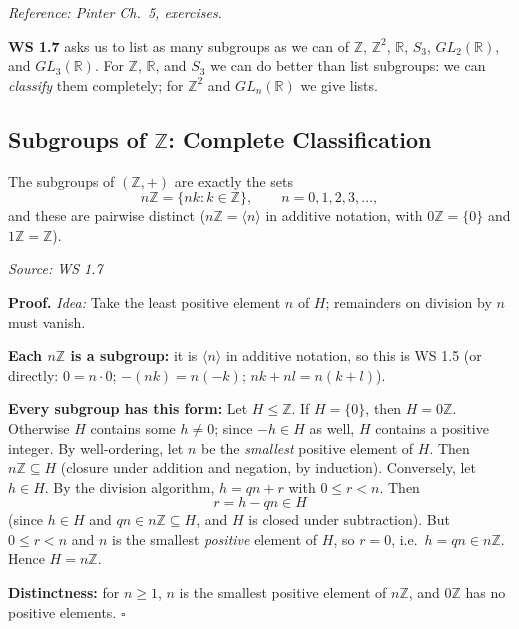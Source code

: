 \documentclass[11pt]{report}
\renewenvironment{proof}[1][Proof]{\noindent\textbf{#1.} }{\hfill$\square$\par\vspace{5pt}}
\newcommand{\srcline}[1]{\par\hfill{\footnotesize\textit{Source: #1}}}
\begin{document}
\textit{Reference: Pinter Ch.\ 5, exercises.}

\textbf{WS 1.7} asks us to list as many subgroups as we can of $\mathbb{Z}$, $\mathbb{Z}^2$, $\mathbb{R}$, $S_3$, $GL_2(\mathbb{R})$, and $GL_3(\mathbb{R})$. For $\mathbb{Z}$, $\mathbb{R}$, and $S_3$ we can do better than list subgroups: we can \emph{classify} them completely; for $\mathbb{Z}^2$ and $GL_n(\mathbb{R})$ we give lists.

\subsection{\texorpdfstring{Subgroups of $\mathbb{Z}$: Complete Classification}{Subgroups of ℤ: Complete Classification}}

\begin{propbox}\label{prop:subgroups-z}
The subgroups of $(\mathbb{Z}, +)$ are exactly the sets
\[ n\mathbb{Z} = \{nk : k \in \mathbb{Z}\}, \qquad n = 0, 1, 2, 3, \ldots, \]
and these are pairwise distinct ($n\mathbb{Z} = \langle n \rangle$ in additive notation, with $0\mathbb{Z} = \{0\}$ and $1\mathbb{Z} = \mathbb{Z}$).
\srcline{WS 1.7}
\end{propbox}

\begin{proof}
\textit{Idea:} Take the least positive element $n$ of $H$; remainders on division by $n$ must vanish.\par
\textbf{Each $n\mathbb{Z}$ is a subgroup:} it is $\langle n \rangle$ in additive notation, so this is WS 1.5 (or directly: $0 = n \cdot 0$; $-(nk) = n(-k)$; $nk + nl = n(k + l)$).

\textbf{Every subgroup has this form:} Let $H \leq \mathbb{Z}$. If $H = \{0\}$, then $H = 0\mathbb{Z}$. Otherwise $H$ contains some $h \neq 0$; since $-h \in H$ as well, $H$ contains a positive integer. By well-ordering, let $n$ be the \emph{smallest} positive element of $H$. Then $n\mathbb{Z} \subseteq H$ (closure under addition and negation, by induction). Conversely, let $h \in H$. By the division algorithm, $h = qn + r$ with $0 \leq r < n$. Then
\[ r = h - qn \in H \]
(since $h \in H$ and $qn \in n\mathbb{Z} \subseteq H$, and $H$ is closed under subtraction). But $0 \leq r < n$ and $n$ is the smallest \emph{positive} element of $H$, so $r = 0$, i.e.\ $h = qn \in n\mathbb{Z}$. Hence $H = n\mathbb{Z}$.

\textbf{Distinctness:} for $n \geq 1$, $n$ is the smallest positive element of $n\mathbb{Z}$, and $0\mathbb{Z}$ has no positive elements.
\end{proof}
\end{document}
